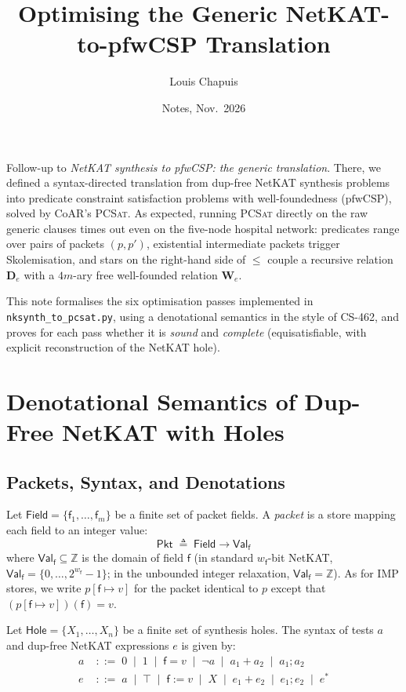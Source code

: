 \documentclass[11pt,a4paper]{article}
\title{Optimising the Generic NetKAT-to-pfwCSP Translation}
\author{Louis Chapuis}
\date{Notes, Nov.\ 2026}
\theoremstyle{definition}
\theoremstyle{remark}
\newcommand{\Pkt}{\mathsf{Pkt}}
\newcommand{\Field}{\mathsf{Field}}
\newcommand{\Val}{\mathsf{Val}}
\newcommand{\Hole}{\mathsf{Hole}}
\begin{document}
\maketitle

\noindent
Follow-up to \emph{NetKAT synthesis to pfwCSP: the generic translation}. There, we defined a
syntax-directed translation from dup-free NetKAT synthesis problems into predicate constraint
satisfaction problems with well-foundedness ($\text{pfwCSP}$), solved by CoAR's \textsc{PCSat}.
As expected, running \textsc{PCSat} directly on the raw generic clauses times out even on the
five-node hospital network: predicates range over pairs of packets $(p,p')$, existential
intermediate packets trigger Skolemisation, and stars on the right-hand side of $\le$ couple a
recursive relation $\mathbf{D}_e$ with a $4m$-ary free well-founded relation $\mathbf{W}_e$.

This note formalises the six optimisation passes implemented in \texttt{nksynth\_to\_pcsat.py},
using a denotational semantics in the style of CS-462, and proves for each pass whether it is
\emph{sound} and \emph{complete} (equisatisfiable, with explicit reconstruction of the NetKAT hole).

\section{Denotational Semantics of Dup-Free NetKAT with Holes}

\subsection{Packets, Syntax, and Denotations}

Let $\Field = \{\mathsf{f}_1, \dots, \mathsf{f}_m\}$ be a finite set of packet fields. A
\emph{packet} is a store mapping each field to an integer value:
\[
  \Pkt \;\triangleq\; \Field \to \Val_{\mathsf{f}}
\]
where $\Val_{\mathsf{f}} \subseteq \mathbb{Z}$ is the domain of field $\mathsf{f}$ (in standard
$w_{\mathsf{f}}$-bit NetKAT, $\Val_{\mathsf{f}} = \{0, \dots, 2^{w_{\mathsf{f}}} - 1\}$; in the
unbounded integer relaxation, $\Val_{\mathsf{f}} = \mathbb{Z}$). As for IMP stores, we write
$p[\mathsf{f} \mapsto v]$ for the packet identical to $p$ except that
$(p[\mathsf{f} \mapsto v])(\mathsf{f}) = v$.

Let $\Hole = \{X_1, \dots, X_n\}$ be a finite set of synthesis holes. The syntax of tests $a$ and
dup-free NetKAT expressions $e$ is given by:
\begin{align*}
  a &\;::=\; 0 \;\mid\; 1 \;\mid\; \mathsf{f} = v \;\mid\; \neg a \;\mid\; a_1 + a_2 \;\mid\; a_1 ; a_2 \\
  e &\;::=\; a \;\mid\; \top \;\mid\; \mathsf{f} := v \;\mid\; X \;\mid\; e_1 + e_2 \;\mid\; e_1 ; e_2 \;\mid\; e^*
\end{align*}
\end{document}
